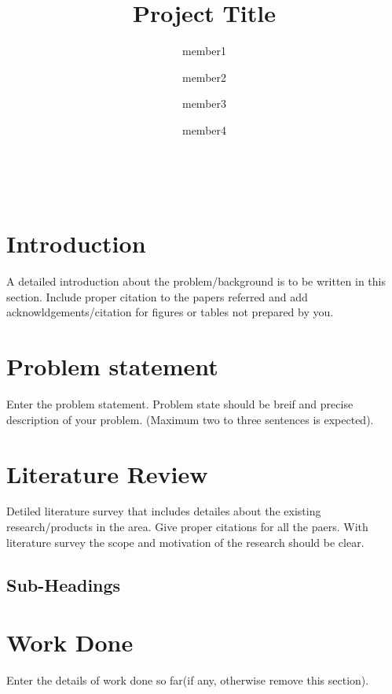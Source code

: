 \documentclass[twocolumn]{article}
\begin{document}
\title{\textbf{Project Title}}\\


\author{member1 \and member2 \and member3 \and member4}





\section{Introduction}
A detailed introduction  about the problem/background  is to be written in this section. Include proper citation to the papers referred and add acknowldgements/citation for figures or tables  not prepared by you.

\section{Problem statement}
Enter the problem statement. Problem state should be breif and precise description of your problem. (Maximum two to three sentences is  expected).

\section{Literature Review}
Detiled literature survey that includes detailes about the existing research/products in the area. Give proper citations for all the paers. With literature survey the scope and motivation of the  research should be clear. 

\subsection{Sub-Headings}

\section{Work Done}
Enter the details of work done so far(if any, otherwise remove this section).
\end{document}
